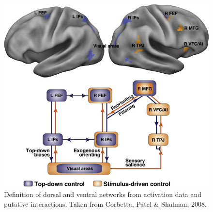 \documentclass[a4paper, 11pt]{scrreprt}
\begin{document}
\begin{figure}
	\includegraphics[scale=0.4]{img/attentionnetworks.png}
	\caption[Dorsal and ventral attention networks]
	{\small{Definition of dorsal and ventral networks from activation data and putative interactions. Taken from Corbetta, Patel \& Shulman, 2008.}}
	\label{fig:Networks}
\end{figure}
\end{document}
